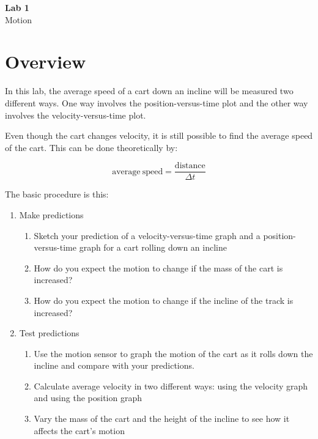 \documentclass{article}
\begin{document}
\fancyfoot[C]{\thepage}
\vspace*{0cm}
\begin{center}
	{\LARGE \textbf{Lab 1}}\\
	\vspace{.25cm}
	{\Large Motion}
\end{center}

\section*{Overview}

In this lab, the average speed of a cart down an incline will be measured two different ways. One way involves the position-versus-time plot and the other way involves the velocity-versus-time plot.

Even though the cart changes velocity, it is still possible to find the average speed of the
cart. This can be done theoretically by:

\begin{equation}
	\mathrm{average\ speed}=\frac{\mathrm{distance}}{\Delta t}
\end{equation}

The basic procedure is this:

\begin{enumerate}
	\item Make predictions
	\begin{enumerate}
		\item Sketch your prediction of a velocity-versus-time graph and a position-versus-time graph for a cart rolling down an incline
		\item How do you expect the motion to change if the mass of the cart is increased?
		\item How do you expect the motion to change if the incline of the track is increased?
	\end{enumerate}
	\item Test predictions
	\begin{enumerate}
		\item Use the motion sensor to graph the motion of the cart as it rolls down the incline and compare with your predictions.
		\item Calculate average velocity in two different ways: using the velocity graph and using the position graph
		\item Vary the mass of the cart and the height of the incline to see how it affects the cart's motion
	\end{enumerate}
\end{enumerate}
\end{document}
